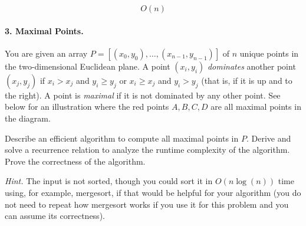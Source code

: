 \documentclass[11pt]{article}
\begin{document}
\begin{equation*}
    \boxed{O(n)}
\end{equation*}

\newpage
\paragraph{3. Maximal Points.} You are given an array $P = [(x_0, y_0), \dots, (x_{n-1}, y_{n-1})]$ of $n$ unique points in the two-dimensional Euclidean plane. A point \( (x_i, y_i) \) \textit{dominates} another point \( (x_j, y_j) \) if \( x_i > x_j \) and \( y_i \geq y_j \) or \( x_i \geq x_j \) and \( y_i > y_j \) (that is, if it is up and to the right). A point is \textit{maximal} if it is not dominated by any other point.
See below for an illustration where the red points $A,B,C,D$ are all maximal points in the diagram.
\begin{center}
\end{center}
Describe an efficient algorithm to compute all maximal points in $P$.  Derive and solve a recurrence relation to analyze the runtime complexity of the algorithm. Prove the correctness of the algorithm.

\textit{Hint.} The input is not sorted, though you could sort it in $O(n \log(n))$ time using, for example, mergesort, if that would be helpful for your algorithm (you do not need to repeat how mergesort works if you use it for this problem and you can assume its correctness).
\end{document}
